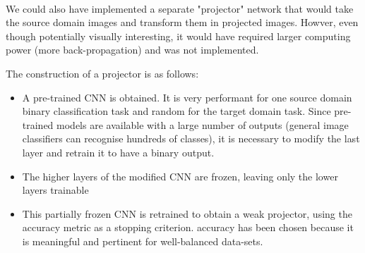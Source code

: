 \documentclass[11 pt]{article}
\begin{document}
\paragraph{} We could also have implemented a separate "projector" network that would take the source domain images and transform them in projected images. Howver, even though potentially visually interesting, it would have required larger computing power (more back-propagation) and was not implemented.

\pagebreak

\begin{samepage}
The construction of a projector is as follows:
\medskip
  \begin{itemize}
    \item A pre-trained CNN is obtained. It is very performant for one source domain binary classification task and random for the target domain task. Since pre-trained models are available with a large number of outputs (general image classifiers can recognise hundreds of classes), it is necessary to modify the last layer and retrain it to have a binary output.
    \nopagebreak
    \item The higher layers of the modified CNN are frozen, leaving only the lower layers trainable 
    \nopagebreak
    \item This partially frozen CNN is retrained to obtain a weak projector, using the accuracy metric as a stopping criterion. accuracy has been chosen because it is meaningful and pertinent for well-balanced data-sets.
  \end{itemize}
\end{samepage}
\end{document}
